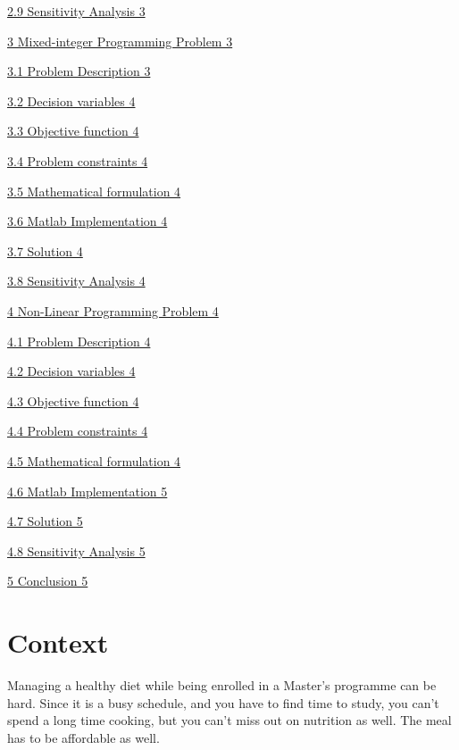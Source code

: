 \documentclass[
]{article}
\begin{document}
\protect\hyperlink{sensitivity-analysis}{2.9 Sensitivity Analysis 3}

\protect\hyperlink{mixed-integer-programming-problem}{3 Mixed-integer
Programming Problem 3}

\protect\hyperlink{problem-description-1}{3.1 Problem Description 3}

\protect\hyperlink{_Toc84701465}{3.2 Decision variables 4}

\protect\hyperlink{_Toc84701466}{3.3 Objective function 4}

\protect\hyperlink{problem-constraints-1}{3.4 Problem constraints 4}

\protect\hyperlink{mathematical-formulation-1}{3.5 Mathematical
formulation 4}

\protect\hyperlink{matlab-implementation-1}{3.6 Matlab Implementation 4}

\protect\hyperlink{solution-1}{3.7 Solution 4}

\protect\hyperlink{sensitivity-analysis-1}{3.8 Sensitivity Analysis 4}

\protect\hyperlink{non-linear-programming-problem}{4 Non-Linear
Programming Problem 4}

\protect\hyperlink{problem-description-2}{4.1 Problem Description 4}

\protect\hyperlink{_Toc84701474}{4.2 Decision variables 4}

\protect\hyperlink{_Toc84701475}{4.3 Objective function 4}

\protect\hyperlink{problem-constraints-2}{4.4 Problem constraints 4}

\protect\hyperlink{mathematical-formulation-2}{4.5 Mathematical
formulation 4}

\protect\hyperlink{matlab-implementation-2}{4.6 Matlab Implementation 5}

\protect\hyperlink{solution-2}{4.7 Solution 5}

\protect\hyperlink{sensitivity-analysis-2}{4.8 Sensitivity Analysis 5}

\protect\hyperlink{conclusion}{5 Conclusion 5}
\newpage

\hypertarget{context}{%
	\section{Context}\label{context}}

Managing a healthy diet while being enrolled in a Master's programme can be hard.
Since it is a busy schedule, and you have to find time to study, you can't spend a long time cooking, but you can't
miss out on nutrition as well. The meal has to be affordable as well. 
\end{document}
